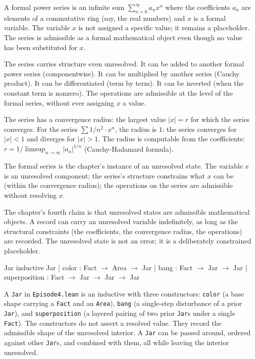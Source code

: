 A formal power series is an infinite sum $\sum_{n=0}^\infty a_n x^n$
where the coefficients $a_n$ are elements of a commutative ring (say,
the real numbers) and $x$ is a formal variable. The variable $x$ is
not assigned a specific value; it remains a placeholder. The series
is admissible as a formal mathematical object even though no value
has been substituted for $x$.

The series carries structure even unresolved. It can be added to
another formal power series (componentwise). It can be multiplied by
another series (Cauchy product). It can be differentiated (term by
term). It can be inverted (when the constant term is nonzero). The
operations are admissible at the level of the formal series, without
ever assigning $x$ a value.

The series has a convergence radius: the largest value $|x| = r$ for
which the series converges. For the series $\sum 1/n^2 \cdot x^n$, the
radius is $1$: the series converges for $|x| < 1$ and diverges for
$|x| > 1$. The radius is computable from the coefficients: $r =
1 / \limsup_{n \to \infty} |a_n|^{1/n}$ (Cauchy-Hadamard formula).

The formal series is the chapter's instance of an unresolved state.
The variable $x$ is an unresolved component; the series's structure
constrains what $x$ can be (within the convergence radius); the
operations on the series are admissible without resolving $x$.

The chapter's fourth claim is that unresolved states are admissible
mathematical objects. A record can carry an unresolved variable
indefinitely, as long as the structural constraints (the
coefficients, the convergence radius, the operations) are recorded.
The unresolved state is not an error; it is a deliberately
constrained placeholder.

\begin{leanexcerpt}{Jar}
inductive Jar
  | color         : Fact $\to$ Area $\to$ Jar
  | bang          : Fact $\to$ Jar $\to$ Jar
  | superposition : Fact $\to$ Jar $\to$ Jar $\to$ Jar
\end{leanexcerpt}

A \texttt{Jar} in \texttt{Episode4.lean} is an inductive with three
constructors: \texttt{color} (a base shape carrying a \texttt{Fact}
and an \texttt{Area}), \texttt{bang} (a single-step disturbance of
a prior \texttt{Jar}), and \texttt{superposition} (a layered pairing
of two prior \texttt{Jar}s under a single \texttt{Fact}). The
constructors do not assert a resolved value. They record the
admissible shape of the unresolved interior. A \texttt{Jar} can be
passed around, ordered against other \texttt{Jar}s, and combined
with them, all while leaving the interior unresolved.

